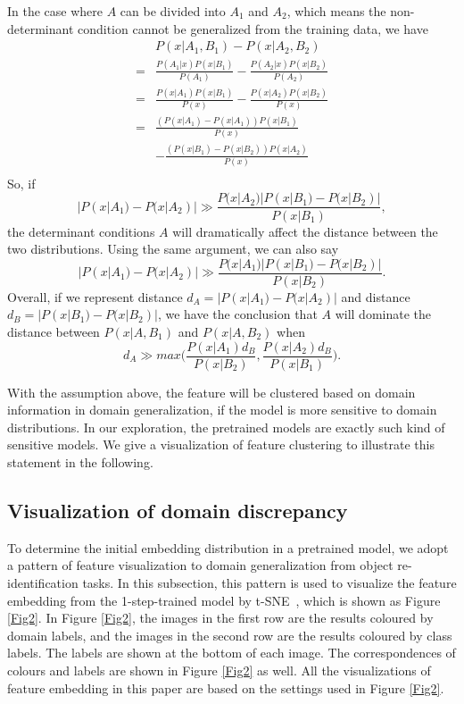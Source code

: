 \documentclass[a4paper,fleqn]{cas-dc}
\begin{document}
In the case where $A$ can be divided into $A_{1}$ and $A_{2}$, which means the non-determinant condition cannot be generalized from the training data, we have 
\begin{align} \nonumber
    &P(x|A_{1},B_{1}) - P(x|A_{2},B_{2})\\  \nonumber
    =& \frac{P(A_{1}|x)P(x|B_{1})}{P(A_{1})} -\frac{P(A_{2}|x)P(x|B_{2})}{P(A_{2})} \\ \nonumber
    =&\frac{P(x|A_{1})P(x|B_{1})}{P(x)} -\frac{P(x|A_{2})P(x|B_{2})}{P(x)} \\ \nonumber
    =& \frac{(P(x|A_{1})-P(x|A_{1}))P(x|B_{1})}{P(x)}\\ \nonumber
     &-\frac{(P(x|B_{1})-P(x|B_{2}))P(x|A_{2})}{P(x)} \\ \nonumber
\end{align}
So, if
\[|P(x|A_{1})-P(x|A_{2})| \gg \frac{P(x|A_{2})|P(x|B_{1})-P(x|B_{2})|}{P(x|B_{1})},\]
the determinant conditions $A$ will dramatically affect the distance between the two distributions. Using the same argument, we can also say 
\[|P(x|A_{1})-P(x|A_{2})| \gg \frac{P(x|A_{1})|P(x|B_{1})-P(x|B_{2})|}{P(x|B_{2})}.\]
Overall, if we represent distance $d_{A}=|P(x|A_{1})-P(x|A_{2})|$ and distance $d_{B}=|P(x|B_{1})-P(x|B_{2})|$, we have the conclusion that $A$ will dominate the distance between $P(x|A,B_{1})$ and $P(x|A,B_{2})$ when \[d_{A} \gg max\big(\frac{P(x|A_{1})d_{B}}{P(x|B_{2})},\frac{P(x|A_{2})d_{B}}{P(x|B_{1})}\big).\]
\par
With the assumption above, the feature will be clustered based on domain information in domain generalization, if the model is more sensitive to domain distributions. In our exploration, the pretrained models are exactly such kind of sensitive models. We give a visualization of feature clustering to illustrate this statement in the following. 

\subsection{Visualization of domain discrepancy}
  To determine the initial embedding distribution in a pretrained model, we adopt a pattern of feature visualization to domain generalization from object re-identification tasks. In this subsection, this pattern is used to visualize the feature embedding from the 1-step-trained model by t-SNE~\cite{tsne}, which is shown as Figure \ref{Fig2}. In Figure \ref{Fig2}, the images in the first row are the results coloured by domain labels, and the images in the second row are the results coloured by class labels. The labels are shown at the bottom of each image. The correspondences of colours and labels are shown in Figure \ref{Fig2} as well. All the visualizations of feature embedding in this paper are based on the settings used in Figure \ref{Fig2}.
  
\end{document}
